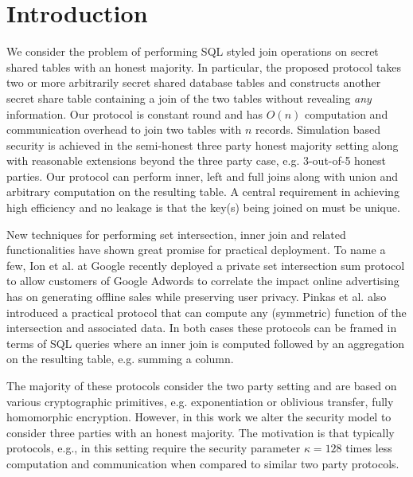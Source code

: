 \section{Introduction}

We consider the problem of performing SQL styled join operations on secret shared tables with an honest majority. In particular, the proposed protocol takes two or more arbitrarily secret shared database tables and constructs another secret share table containing a join of the two tables without revealing \emph{any}  information. Our protocol is constant round and  has $O(n)$ computation and communication  overhead to join two tables with $n$ records. Simulation based security is achieved in the semi-honest three party honest majority setting along with reasonable extensions beyond the three party case, e.g. 3-out-of-5 honest parties. Our protocol can perform inner, left and full joins along with union and arbitrary computation on the resulting table. A central requirement in achieving high efficiency and no leakage is that the key(s) being joined on must be unique. 

New techniques \cite{usenix:PSZ14,USENIX:PSSZ15,PSZ16,CCS:KKRT16,PSWW18,CLR17,CHLR18,cryptoeprint:2017:738,RA17,KLSAP17,OOS17,KMPRT17} for performing set intersection, inner join and related functionalities have shown great promise for practical deployment. To name a few, Ion et al. at Google recently deployed a private set intersection sum protocol\cite{cryptoeprint:2017:738} to allow customers of Google Adwords to correlate the impact online advertising has on generating offline sales while preserving user privacy. Pinkas et al. \cite{PSWW18} also introduced a practical protocol that can compute any (symmetric) function of the intersection and associated data. In both cases these protocols can be framed in terms of SQL queries where an inner join is computed followed by an aggregation on the resulting table, e.g. summing a column.  

The majority of these protocols consider the two party setting and are based on various cryptographic primitives, e.g. exponentiation\cite{cryptoeprint:2017:738} or oblivious transfer\cite{PSWW18}, fully homomorphic encryption\cite{CLR17}. However, in this work we alter the security model to consider three parties with an honest majority. The motivation is that typically protocols, e.g.\cite{highthroughput}, in this setting require the security parameter $\kappa=128$ times less computation and communication when compared to similar two party protocols.

